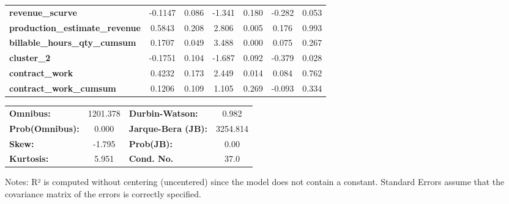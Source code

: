 \begin{center}
\begin{tabular}{lcccccc}
\textbf{revenue\_scurve}               &      -0.1147  &        0.086     &    -1.341  &         0.180        &       -0.282    &        0.053     \\
\textbf{production\_estimate\_revenue} &       0.5843  &        0.208     &     2.806  &         0.005        &        0.176    &        0.993     \\
\textbf{billable\_hours\_qty\_cumsum}  &       0.1707  &        0.049     &     3.488  &         0.000        &        0.075    &        0.267     \\
\textbf{cluster\_2}                    &      -0.1751  &        0.104     &    -1.687  &         0.092        &       -0.379    &        0.028     \\
\textbf{contract\_work}                &       0.4232  &        0.173     &     2.449  &         0.014        &        0.084    &        0.762     \\
\textbf{contract\_work\_cumsum}        &       0.1206  &        0.109     &     1.105  &         0.269        &       -0.093    &        0.334     \\
\bottomrule
\end{tabular}
\begin{tabular}{lclc}
\textbf{Omnibus:}       & 1201.378 & \textbf{  Durbin-Watson:     } &    0.982  \\
\textbf{Prob(Omnibus):} &   0.000  & \textbf{  Jarque-Bera (JB):  } & 3254.814  \\
\textbf{Skew:}          &  -1.795  & \textbf{  Prob(JB):          } &     0.00  \\
\textbf{Kurtosis:}      &   5.951  & \textbf{  Cond. No.          } &     37.0  \\
\bottomrule
\end{tabular}
\end{center}

Notes: \newline
 [1] R² is computed without centering (uncentered) since the model does not contain a constant. \newline
 [2] Standard Errors assume that the covariance matrix of the errors is correctly specified.